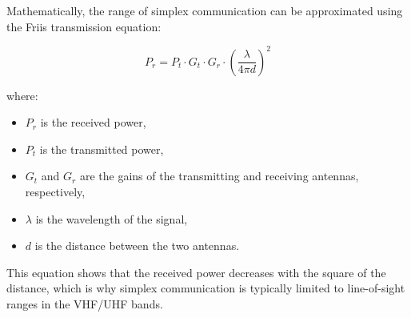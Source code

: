 Mathematically, the range of simplex communication can be approximated using the Friis transmission equation:

\[
P_r = P_t \cdot G_t \cdot G_r \cdot \left( \frac{\lambda}{4 \pi d} \right)^2
\]

where:
\begin{itemize}
    \item \( P_r \) is the received power,
    \item \( P_t \) is the transmitted power,
    \item \( G_t \) and \( G_r \) are the gains of the transmitting and receiving antennas, respectively,
    \item \( \lambda \) is the wavelength of the signal,
    \item \( d \) is the distance between the two antennas.
\end{itemize}

This equation shows that the received power decreases with the square of the distance, which is why simplex communication is typically limited to line-of-sight ranges in the VHF/UHF bands.

